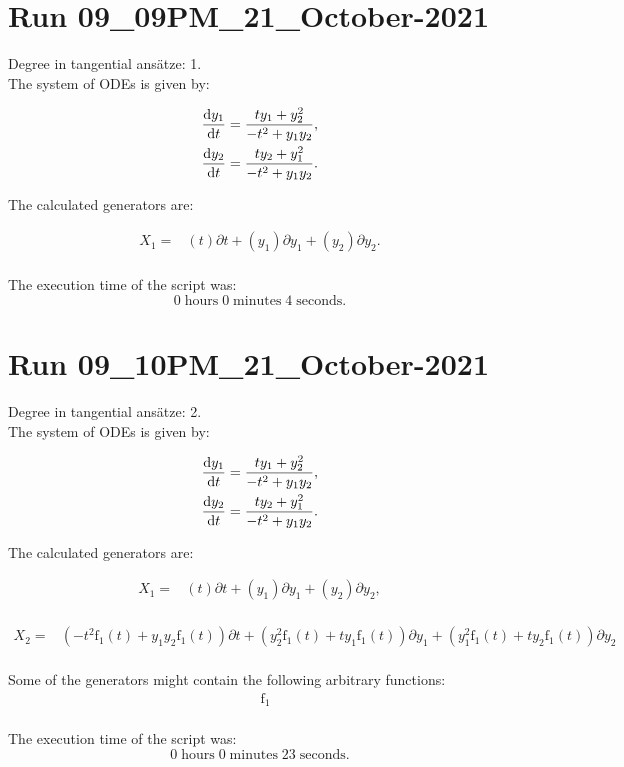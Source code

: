 \section*{Run 09\_09PM\_21\_October-2021}
Degree in tangential ansätze:	1.\\
The system of ODEs is given by:

\begin{align*}
\dv{y_{1}}{t}&=\frac{t y_{1} + y_{2}^{2}}{- t^{2} + y_{1} y_{2}},\\
\dv{y_{2}}{t}&=\frac{t y_{2} + y_{1}^{2}}{- t^{2} + y_{1} y_{2}}.\\
\end{align*}

\noindent The calculated generators are:

\begin{align*}
X_{1}=&\left(t \right)\partial t+\left(y_{1} \right)\partial y_{1}+\left(y_{2} \right)\partial y_{2}.\\
\end{align*}

\noindent The execution time of the script was:
$$0\;\mathrm{hours}\;0\;\mathrm{minutes}\;4 \;\mathrm{seconds}.$$
\section*{Run 09\_10PM\_21\_October-2021}
Degree in tangential ansätze:	2.\\
The system of ODEs is given by:

\begin{align*}
\dv{y_{1}}{t}&=\frac{t y_{1} + y_{2}^{2}}{- t^{2} + y_{1} y_{2}},\\
\dv{y_{2}}{t}&=\frac{t y_{2} + y_{1}^{2}}{- t^{2} + y_{1} y_{2}}.\\
\end{align*}

\noindent The calculated generators are:

\begin{align*}
X_{1}=&\left(t \right)\partial t+\left(y_{1} \right)\partial y_{1}+\left(y_{2} \right)\partial y_{2},\\
\end{align*}

\begin{align*}
X_{2}=&\left(- t^{2} \operatorname{f_{1}}{\left(t \right)}+y_{1} y_{2} \operatorname{f_{1}}{\left(t \right)} \right)\partial t+\left(y_{2}^{2} \operatorname{f_{1}}{\left(t \right)}+t y_{1} \operatorname{f_{1}}{\left(t \right)} \right)\partial y_{1}+\left(y_{1}^{2} \operatorname{f_{1}}{\left(t \right)}+t y_{2} \operatorname{f_{1}}{\left(t \right)} \right)\partial y_{2}\\
\end{align*}



\noindent Some of the generators might contain the following arbitrary functions:
\begin{align*}
&\operatorname{f_{1}}\\
\end{align*}

\noindent The execution time of the script was:
$$0\;\mathrm{hours}\;0\;\mathrm{minutes}\;23 \;\mathrm{seconds}.$$
